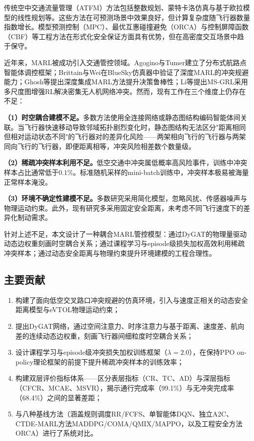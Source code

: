 \documentclass[12pt,a4paper,UTF8]{ctexart}
\begin{document}
传统空中交通流量管理（ATFM）方法包括整数规划、蒙特卡洛仿真与基于欧拉模型的线性规划等\cite{ref2}。这些方法在可预测场景中效果良好，但计算复杂度随飞行器数量指数增长。模型预测控制（MPC）\cite{ref3}、最优互惠碰撞避免（ORCA）\cite{ref4}与控制屏障函数（CBF）\cite{ref5}等工程方法在形式化安全保证方面具有优势，但在高密度交互场景中趋于保守。

近年来，MARL被成功引入交通管控领域。Agogino与Tumer\cite{ref6,ref7}建立了分布式航路点智能体调控框架；Brittain与Wei\cite{ref8}在BlueSky仿真器中验证了深度MARL的冲突规避能力；Ghosh等\cite{ref9}提出深度集成MARL方法提升决策鲁棒性；Li等\cite{ref10}提出MS-GRL采用多尺度图增强RL解决密集无人机网络冲突。然而，现有工作在三个维度上仍存在不足：

\textbf{（1）时空耦合建模不足。}多数方法使用全连接网络或静态图结构编码智能体间关联。当飞行器快速移动导致邻域拓扑剧烈变化时，静态图结构无法区分"距离相同但相对运动状态不同"的飞行器对的差异化风险——两架相向飞行的飞行器与两架同向飞行的飞行器，即便距离相等，冲突风险相差数个数量级。

\textbf{（2）稀疏冲突样本利用不足。}低空交通中冲突属低概率高风险事件，训练中冲突样本占比通常低于$0.1\%$。标准随机采样的mini-batch训练中，冲突样本极易被海量正常样本淹没\cite{ref11,ref12}。

\textbf{（3）环境不确定性建模不足。}多数研究采用简化模型，忽略风扰、传感器噪声与物理运动约束\cite{ref13}。此外，现有研究多采用固定安全距离，未考虑不同飞行速度下的差异化制动需求。

针对上述不足，本文设计了一种耦合MARL管控模型：通过DyGAT的物理量驱动动态边权重刻画时空耦合关系；通过课程学习与episode级损失加权高效利用稀疏冲突样本；通过动态安全距离与物理约束提升环境建模的工程合理性。

\subsection{主要贡献}

\begin{enumerate}[label=(\arabic*)]
    \item 构建了面向低空交叉路口冲突规避的仿真环境，引入与速度正相关的动态安全距离模型与eVTOL物理运动约束；
    \item 提出DyGAT网络，通过空间注意力、时序注意力与基于距离、速度差、航向差的连续动态边权重，刻画飞行器间细粒度时空耦合关系；
    \item 设计课程学习与episode级冲突损失加权训练框架（$\lambda=2.0$），在保持PPO on-policy理论框架的前提下提升稀疏冲突样本的训练效率；
    \item 构建双层评价指标体系——区分表层指标（CR、TC、AD）与深层指标（CFCR、MCAE、MSVR），揭示通行完成率（99.1\%）与无冲突完成率（68.4\%）之间的显著差距；
    \item 与八种基线方法（涵盖规则调度RR/FCFS、单智能体DQN、独立A2C、CTDE-MARL方法MADDPG/COMA/QMIX/MAPPO，以及工程安全方法ORCA）进行了系统对比。
\end{enumerate}
\end{document}
